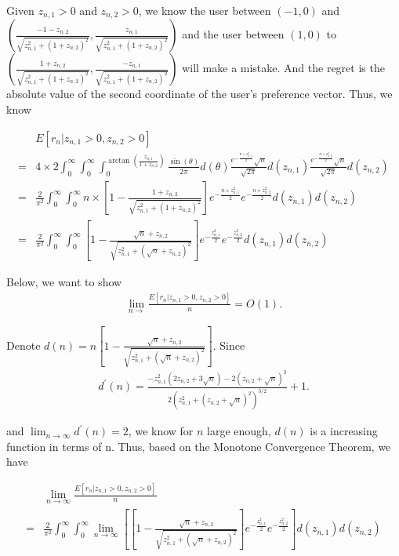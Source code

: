 \documentclass{article}
\begin{document}
Given $z_{n,1}>0$ and $z_{n,2}>0$, we know the user between $(-1,0)$ and $(\frac{-1-z_{n,2}}{\sqrt{z_{n,1}^2+(1+z_{n,2})^2}}, \frac{z_{n,1}}{\sqrt{z_{n,1}^2+(1+z_{n,2})^2}})$ and the user between $(1,0)$ to $(\frac{1+z_{n,2}}{\sqrt{z_{n,1}^2+(1+z_{n,2})^2}}, \frac{-z_{n,1}}{\sqrt{z_{n,1}^2+(1+z_{n,2})^2}})$ will make a mistake. And the regret is the absolute value of the second coordinate of the user's preference vector. Thus, we know

\begin{align}
&E[r_n| z_{n,1}>0, z_{n,2}>0] \nonumber \\
=& 4\times 2 \int_{0}^{\infty} \int_{0}^{\infty} \int_{0}^{\arctan(\frac{z_{n,1}}{1+z_{n,2}})}\frac{\sin(\theta)}{2\pi}d(\theta)\frac{e^{-\frac{n \times z_{n,1}^2}{2}}\sqrt{n}}{\sqrt{2\pi}}d(z_{n,1})\frac{e^{-\frac{n \times z_{n,2}^2}{2}}\sqrt{n}}{\sqrt{2\pi}}d(z_{n,2}) \nonumber \\
=& \frac{2}{\pi^2}\int_{0}^{\infty} \int_{0}^{\infty}n\times [1-\frac{1+z_{n,2}}{\sqrt{z_{n,1}^2+(1+z_{n,2})^2}}]e^{-\frac{n \times z_{n,1}^2}{2}}e^{-\frac{n \times z_{n,2}^2}{2}}d(z_{n,1})d(z_{n,2}) \nonumber \\
=& \frac{2}{\pi^2}\int_{0}^{\infty} \int_{0}^{\infty} \left[1-\frac{\sqrt{n}+z_{n,2}}{\sqrt{z_{n,1}^2+(\sqrt{n}+z_{n,2})^2}}\right]e^{-\frac{z_{n,1}^2}{2}}e^{-\frac{z_{n,2}^2}{2}}d(z_{n,1})d(z_{n,2}) \nonumber 
\end{align}

Below, we want to show 
\begin{align}
\lim_{n\rightarrow}\frac{E[r_n| z_{n,1}>0, z_{n,2}>0]}{n} = O(1). \nonumber
\end{align}

Denote $d(n)=n\left[1-\frac{\sqrt{n}+z_{n,2}}{\sqrt{z_{n,1}^2+(\sqrt{n}+z_{n,2})^2}}\right]$.
Since
\begin{align}
d^{'}(n)=\frac{-z_{n,1}^2(2z_{n,2}+3\sqrt{n})-2(z_{n,2}+\sqrt{n})^3}{2(z_{n,1}^2+(z_{n,2}+\sqrt{n})^2)^{3/2}}+1. \nonumber
\end{align}

and $\lim_{n\rightarrow \infty}d^{'}(n)=2$, we know for $n$ large enough, $d(n)$ is a increasing function in terms of n. Thus, based on the Monotone Convergence Theorem, we have

\begin{align}
&\lim_{n\rightarrow \infty}\frac{E[r_n| z_{n,1}>0, z_{n,2}>0]}{n} \nonumber \\
=& \frac{2}{\pi^2}\int_{0}^{\infty} \int_{0}^{\infty}\lim_{n\rightarrow \infty}\left[ \left[1-\frac{\sqrt{n}+z_{n,2}}{\sqrt{z_{n,1}^2+(\sqrt{n}+z_{n,2})^2}}\right]e^{-\frac{z_{n,1}^2}{2}}e^{-\frac{z_{n,2}^2}{2}}\right]d(z_{n,1})d(z_{n,2}) \nonumber  
\end{align}
\end{document}
